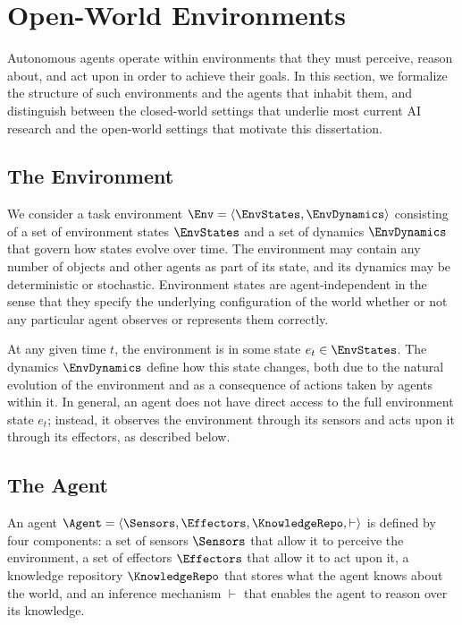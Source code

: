 \section{Open-World Environments}
\label{sec:open_world_environments}

Autonomous agents operate within environments that they must perceive, reason about, and act upon in order to achieve their goals. In this section, we formalize the structure of such environments and the agents that inhabit them, and distinguish between the closed-world settings that underlie most current AI research and the open-world settings that motivate this dissertation.

\subsection{The Environment}
\label{sec:environment}

We consider a task environment $\Env = \langle \EnvStates, \EnvDynamics \rangle$ consisting of a set of environment states $\EnvStates$ and a set of dynamics $\EnvDynamics$ that govern how states evolve over time. The environment may contain any number of objects and other agents as part of its state, and its dynamics may be deterministic or stochastic. Environment states are agent-independent in the sense that they specify the underlying configuration of the world whether or not any particular agent observes or represents them correctly.

At any given time $t$, the environment is in some state $e_t \in \EnvStates$. The dynamics $\EnvDynamics$ define how this state changes, both due to the natural evolution of the environment and as a consequence of actions taken by agents within it. In general, an agent does not have direct access to the full environment state $e_t$; instead, it observes the environment through its sensors and acts upon it through its effectors, as described below.

\subsection{The Agent}
\label{sec:agent}

An agent $\Agent = \langle \Sensors, \Effectors, \KnowledgeRepo, \vdash \rangle$ is defined by four components: a set of sensors $\Sensors$ that allow it to perceive the environment, a set of effectors $\Effectors$ that allow it to act upon it, a knowledge repository $\KnowledgeRepo$ that stores what the agent knows about the world, and an inference mechanism $\vdash$ that enables the agent to reason over its knowledge.

